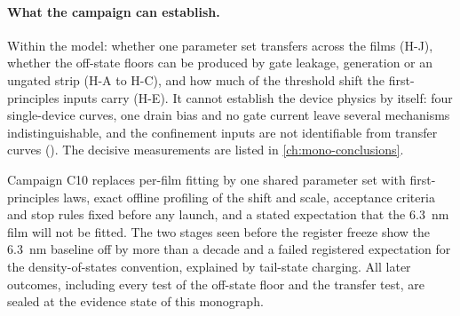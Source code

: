 \paragraph{What the campaign can establish.} Within the model: whether one parameter set transfers across the films
(H-J), whether the off-state floors can be produced by gate leakage, generation or an ungated strip (H-A to H-C), and how
much of the threshold shift the first-principles inputs carry (H-E). It cannot establish the device physics by itself:
four single-device curves, one drain bias and no gate current leave several mechanisms indistinguishable, and the
confinement inputs are not identifiable from transfer curves (). The decisive measurements are listed in
\cref{ch:mono-conclusions}.

\begin{keyresult}
Campaign C10 replaces per-film fitting by one shared parameter set with first-principles laws, exact offline profiling
of the shift and scale, acceptance criteria and stop rules fixed before any launch, and a stated expectation that the
6.3~nm film will not be fitted. The two stages seen before the register freeze show the 6.3~nm baseline off by more than
a decade and a failed registered expectation for the density-of-states convention, explained by tail-state charging.
All later outcomes, including every test of the off-state floor and the transfer test, are sealed at the evidence
state of this monograph.
\end{keyresult}
